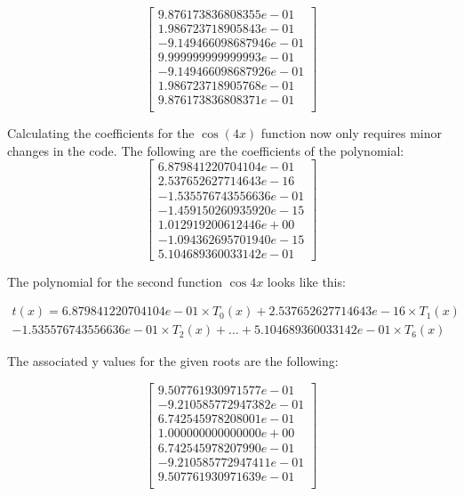\documentclass{article}
\begin{document}
$$
\begin{bmatrix}
9.876173836808355e-01\\
1.986723718905843e-01\\
-9.149466098687946e-01\\
9.999999999999993e-01\\
-9.149466098687926e-01\\
1.986723718905768e-01\\
9.876173836808371e-01\\
\end{bmatrix}
$$

Calculating the coefficients for the $\cos(4x)$ function now only requires minor changes in the code. The following are the coefficients of the polynomial:
$$
\begin{bmatrix} 
6.879841220704104e-01\\
2.537652627714643e-16\\
-1.535576743556636e-01\\
-1.459150260935920e-15\\
1.012919200612446e+00\\
-1.094362695701940e-15\\
5.104689360033142e-01
\end{bmatrix}
$$

The polynomial for the second function $\cos{4x}$ looks like this:

\begin{equation}
  \begin{array}{l}
    t(x) = 6.879841220704104e-01 \times T_0(x) + 2.537652627714643e-16 \times T_1(x) \\ 
    -1.535576743556636e-01 \times T_2(x) + \dots + 5.104689360033142e-01 \times T_6(x)
  \end{array}
\end{equation}

The associated y values for the given roots are the following:

$$
\begin{bmatrix} 
9.507761930971577e-01\\
-9.210585772947382e-01\\
6.742545978208001e-01\\
1.000000000000000e+00\\
6.742545978207990e-01\\
-9.210585772947411e-01\\
9.507761930971639e-01\\
\end{bmatrix}
$$
\end{document}
